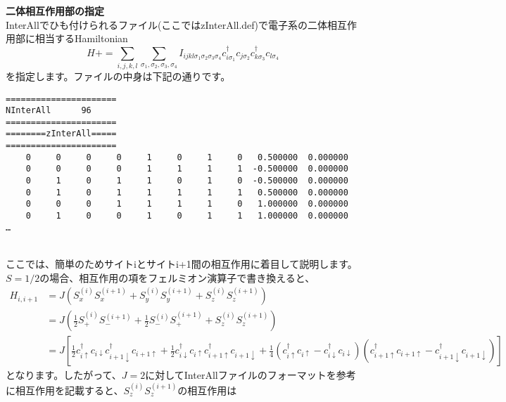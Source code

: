 \begin{description}
\item {\bf 二体相互作用部の指定}\\
InterAllでひも付けられるファイル(ここではzInterAll.def)で電子系の二体相互作用部に相当するHamiltonian
\begin{equation}
H+=\sum_{i,j,k,l}\sum_{\sigma_1,\sigma_2, \sigma_3, \sigma_4}
I_{ijkl\sigma_1\sigma_2\sigma_3\sigma_4}c_{i\sigma_1}^{\dagger}c_{j\sigma_2}c_{k\sigma_3}^{\dagger}c_{l\sigma_4}
\end{equation}
を指定します。ファイルの中身は下記の通りです。\\
\begin{minipage}{16cm}
\begin{screen}
\begin{verbatim}
====================== 
NInterAll      96  
====================== 
========zInterAll===== 
====================== 
    0     0     0     0     1     0     1     0   0.500000  0.000000
    0     0     0     0     1     1     1     1  -0.500000  0.000000
    0     1     0     1     1     0     1     0  -0.500000  0.000000
    0     1     0     1     1     1     1     1   0.500000  0.000000
    0     0     0     1     1     1     1     0   1.000000  0.000000
    0     1     0     0     1     0     1     1   1.000000  0.000000
…
\end{verbatim}
\end{screen}
\end{minipage}
~\\
ここでは、簡単のためサイトiとサイトi+1間の相互作用に着目して説明します。{$S=1/2$の場合、}相互作用の項をフェルミオン演算子で書き換えると、
\begin{align}
H_{i,i+1}&=J(S_x^{(i)}S_x^{(i+1)}+S_y^{(i)}S_y^{(i+1)}+S_z^{(i)}S_z^{(i+1)}) \nonumber\\
&=J \left( \frac{1}{2}S_+^{(i)}S_-^{(i+1)}+\frac{1}{2}S_-^{(i)}S_+^{(i+1)}+S_z^{(i)}S_z^{(i+1)} \right) \nonumber\\
&=J \left[ \frac{1}{2}c_{i\uparrow}^{\dag}c_{i\downarrow}c_{i+1\downarrow}^{\dag}c_{i+1\uparrow}+\frac{1}{2}c_{i\downarrow}^{\dag}c_{i\uparrow}c_{i+1\uparrow}^{\dag}c_{i+1\downarrow}+\frac{1}{4}(c_{i\uparrow}^{\dag}c_{i\uparrow}-c_{i\downarrow}^{\dag}c_{i\downarrow})(c_{i+1\uparrow}^{\dag}c_{i+1\uparrow}-c_{i+1\downarrow}^{\dag}c_{i+1\downarrow}) \right] \nonumber 
\end{align}
となります。したがって、$J=2$に対してInterAllファイルのフォーマットを参考に相互作用を記載すると、$S_z^{(i)}S_z^{(i+1)}$の相互作用は\\
\begin{minipage}{16cm}

\end{minipage}
\end{description}
